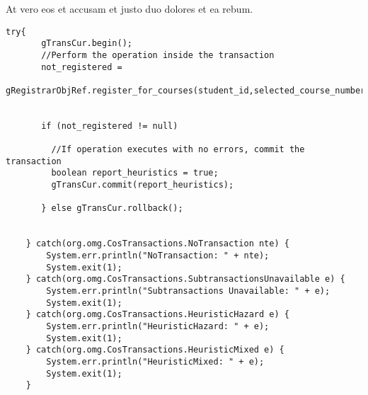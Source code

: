 	At vero eos et accusam et justo duo dolores et ea rebum.
	
	\begin{lstlisting}[style=C++, caption=Implizite Transaktion \cite{tanenbaum2007verteilte}]
	try{
	   gTransCur.begin();
	   //Perform the operation inside the transaction
	   not_registered = 
	       gRegistrarObjRef.register_for_courses(student_id,selected_course_numbers);
	
	
	   if (not_registered != null)
	
	     //If operation executes with no errors, commit the transaction
	     boolean report_heuristics = true;
	     gTransCur.commit(report_heuristics);
	
	   } else gTransCur.rollback();
	
	
	} catch(org.omg.CosTransactions.NoTransaction nte) {
	    System.err.println("NoTransaction: " + nte);
	    System.exit(1);
	} catch(org.omg.CosTransactions.SubtransactionsUnavailable e) {
	    System.err.println("Subtransactions Unavailable: " + e);
	    System.exit(1);
	} catch(org.omg.CosTransactions.HeuristicHazard e) {
	    System.err.println("HeuristicHazard: " + e);
	    System.exit(1);
	} catch(org.omg.CosTransactions.HeuristicMixed e) {
	    System.err.println("HeuristicMixed: " + e);
	    System.exit(1);
	}
	\end{lstlisting}
